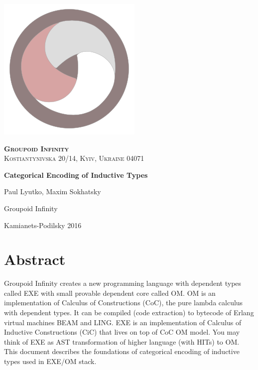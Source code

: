 \documentclass[11pt,oneside]{article}
\begin{document}
\thispagestyle{empty}
\begin{center}

\begingroup
\parbox[t][][l]{0.30\textwidth}{ \includegraphics[scale=0.3]{img/grp} }
\parbox[t][][r]{0.60\textwidth}{ \flushright \textsc{{\Large {\bf {Groupoid Infinity}}}}\\
                                             \textsc{Kostiantynivska 20/14, Kyiv, Ukraine 04071}\\  }\endgroup

\vspace{6cm}   {\Large \bf Categorical Encoding of Inductive Types\\}\par
\vspace{0.3cm} {\Large Paul Lyutko, Maxim Sokhatsky\par}
\vspace{6cm}   {\Large Groupoid Infinity\par}
\vspace{0.3cm} {\Large Kamianets-Podilsky 2016}

\end{center}

\newpage
\vspace{2cm}
\tableofcontents
\newpage

\section{Abstract}

Groupoid Infinity creates a new programming language with dependent types called EXE with small provable dependent core called OM.
OM is an implementation of Calculus of Constructions (CoC), the pure lambda calculus with dependent types.
It can be compiled (code extraction) to bytecode of Erlang virtual machines BEAM and LING.
EXE is an implementation of Calculus of Inductive Constructions (CiC) that lives on top of CoC OM model.
You may think of EXE as AST transformation of higher language (with HITs) to OM. This document describes
the foundations of categorical encoding of inductive types used in EXE/OM stack.
\end{document}
